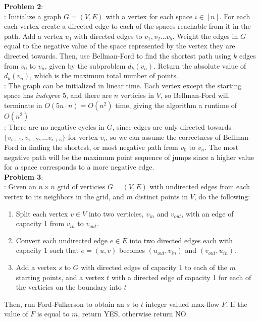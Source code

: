 \documentclass{article}
\begin{document}
\textbf{Problem 2}: \\[1.0ex]
: Initialize a graph $G = (V, E)$ with a vertex for each space $i \in [n]$. For each each vertex create a directed edge to each of the spaces reachable from it in the path. Add a vertex $v_0$ with directed edges to $v_1, v_2 \dots v_5$. Weight the edges in $G$ equal to the negative value of the space represented by the vertex they are directed towards. Then, use Bellman-Ford to find the shortest path using $k$ edges from $v_0$ to $v_n$, given by the subproblem $d_{k}(v_n)$. Return the absolute value of $d_{k}(v_n)$, which is the maximum total number of points. \\[0.5ex]
: The graph can be initialized in linear time. Each vertex except the starting space has \textit{indegree} 5, and there are $n$ verticies in $V$, so Bellman-Ford will terminate in $O(5n \cdot n) = O(n^2)$ time, giving the algorithm a runtime of $O(n^2)$\\[0.5ex]
: There are no negative cycles in $G$, since edges are only directed towards $\{v_{i + 1}, v_{i + 2}, \dots v_{i + 5}\}$ for vertex $v_i$, so  we can assume the correctness of Bellman-Ford in finding the shortest, or most negative path from $v_0$ to $v_n$. The most negative path will be the maximum point sequence of jumps since a higher value for a space corresponds to a more negative edge. \\[1.0ex]
\textbf{Problem 3}: \\[1.0ex]
: Given an $n \times n$ grid of verticies $G = (V, E)$ with undirected edges from each vertex to its neighbors in the grid, and $m$ distinct points in $V$, do the following: \begin{enumerate}
    \item Split each vertex $v \in V$ into two verticies, $v_{in}$ and $v_{out}$, with an edge of capacity 1 from $v_{in}$ to $v_{out}$. 
    \item Convert each undirected edge $e \in E$ into two directed edges each with capacity 1 such that $e = (u, v)$ becomes $(u_{out}, v_{in})$ and $(v_{out}, u_{in})$.
    \item Add a vertex $s$ to $G$ with directed edges of capacity 1 to each of the $m$ starting points, and a vertex $t$ with a directed edge of capacity 1 for each of the verticies on the boundary into $t$
\end{enumerate} Then, run Ford-Fulkerson to obtain an $s$ to $t$ integer valued max-flow $F$. If the value of $F$ is equal to $m$, return YES, otherwise return NO. \\[0.5ex]
\end{document}
